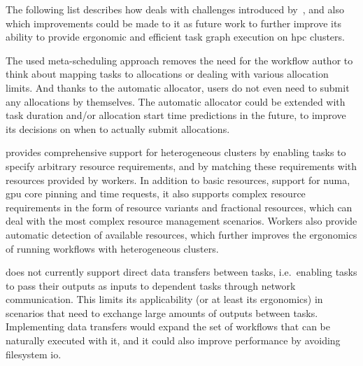 The following list describes how \hyperqueue{} deals with challenges introduced
by~, and also which improvements could be made to it as future work to
further improve its ability to provide ergonomic and efficient task graph execution on
\gls{hpc} clusters.
\begin{description}[wide=0pt]
	\item[Interaction with allocation manager] The used meta-scheduling approach removes the need for the workflow author to think about mapping
		tasks to allocations or dealing with various allocation limits. And thanks to the automatic
		allocator, users do not even need to submit any allocations by themselves. The automatic allocator
		could be extended with task duration and/or allocation start time predictions in the future,
		to improve its decisions on when to actually submit allocations.
	\item[Cluster heterogeneity] \hyperqueue{} provides comprehensive support for heterogeneous
		clusters by enabling tasks to specify arbitrary resource requirements, and by matching these
		requirements with resources provided by workers. In addition to basic resources, support for
		\gls{numa}, \gls{gpu} core pinning and time requests, it also
		supports complex resource requirements in the form of resource variants and fractional resources,
		which can deal with the most complex resource management scenarios. Workers also provide automatic
		detection of available resources, which further improves the ergonomics of running workflows with
		heterogeneous clusters.
	\item[Data transfers] \hyperqueue{} does not currently support direct data transfers
		between tasks, i.e.\ enabling tasks to pass their outputs as inputs to dependent tasks through
		network communication. This limits its applicability (or at least its ergonomics) in scenarios
		that need to exchange large amounts of outputs between tasks. Implementing data transfers would
		expand the set of workflows that can be naturally executed with it, and it could also improve
		performance by avoiding filesystem \gls{io}.


\end{description}
